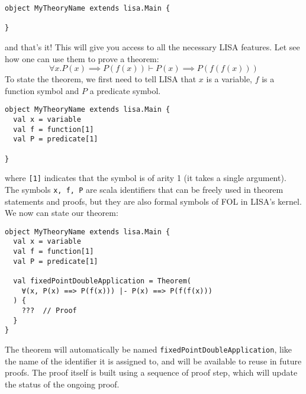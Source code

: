 \noindent\begin{minipage}{\linewidth}\vspace{1em}
\begin{lstlisting}[language=lisa, frame=single]
object MyTheoryName extends lisa.Main {

}
\end{lstlisting}
\end{minipage}
and that's it! This will give you access to all the necessary LISA features. Let see how one can use them to prove a theorem:
$$
  \forall x. P(x) \implies P(f(x)) \vdash P(x) \implies P(f(f(x)))
$$
To state the theorem, we first need to tell LISA that $x$ is a variable, $f$ is a function symbol and $P$ a predicate symbol. 

\noindent\begin{minipage}{\linewidth}\vspace{1em}
\begin{lstlisting}[language=lisa, frame=single]
object MyTheoryName extends lisa.Main {
  val x = variable
  val f = function[1]
  val P = predicate[1]

}
\end{lstlisting}
\end{minipage}

where \lstinline|[1]| indicates that the symbol is of arity 1 (it takes a single argument). The symbols \lstinline|x, f, P| are scala identifiers that can be freely used in theorem statements and proofs, but they are also formal symbols of FOL in LISA's kernel. 
We now can state our theorem:

\noindent\begin{minipage}{\linewidth}\vspace{1em}
\begin{lstlisting}[language=lisa, frame=single]
object MyTheoryName extends lisa.Main {
  val x = variable
  val f = function[1]
  val P = predicate[1]

  val fixedPointDoubleApplication = Theorem(
    ∀(x, P(x) ==> P(f(x))) |- P(x) ==> P(f(f(x)))
  ) {
    ???  // Proof
  } 
}
\end{lstlisting}
\end{minipage}
The theorem will automatically be named \lstinline|fixedPointDoubleApplication|, like the name of the identifier it is assigned to, and will be available to reuse in future proofs. The proof itself is built using a sequence of proof step, which will update the status of the ongoing proof.

